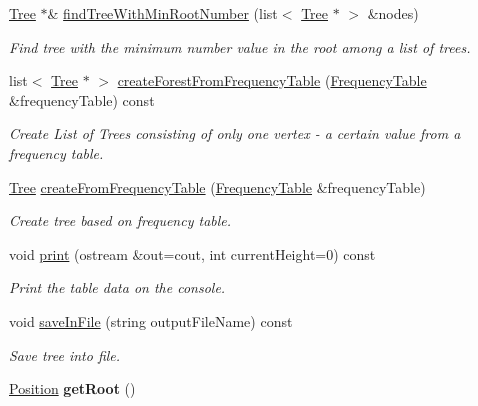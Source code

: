 \begin{DoxyCompactItemize}
\mbox{\hyperlink{class_tree}{Tree}} $\ast$\& \mbox{\hyperlink{class_tree_a7bac2fabb211e80df087763da187d3f6}{find\+Tree\+With\+Min\+Root\+Number}} (list$<$ \mbox{\hyperlink{class_tree}{Tree}} $\ast$ $>$ \&nodes)
\begin{DoxyCompactList}\small\item\em Find tree with the minimum number value in the root among a list of trees. \end{DoxyCompactList}\item 
list$<$ \mbox{\hyperlink{class_tree}{Tree}} $\ast$ $>$ \mbox{\hyperlink{class_tree_a64d7bc9c77c95100c84b708fac936820}{create\+Forest\+From\+Frequency\+Table}} (\mbox{\hyperlink{class_frequency_table}{Frequency\+Table}} \&frequency\+Table) const
\begin{DoxyCompactList}\small\item\em Create List of Trees consisting of only one vertex -\/ a certain value from a frequency table. \end{DoxyCompactList}\item 
\mbox{\hyperlink{class_tree}{Tree}} \mbox{\hyperlink{class_tree_a57608dabdd310f0c412c5d2a03faa9c0}{create\+From\+Frequency\+Table}} (\mbox{\hyperlink{class_frequency_table}{Frequency\+Table}} \&frequency\+Table)
\begin{DoxyCompactList}\small\item\em Create tree based on frequency table. \end{DoxyCompactList}\item 
\mbox{\label{class_tree_a06a149462a8abcc4e548c1f0e3561ee7}} 
void \mbox{\hyperlink{class_tree_a06a149462a8abcc4e548c1f0e3561ee7}{print}} (ostream \&out=cout, int current\+Height=0) const
\begin{DoxyCompactList}\small\item\em Print the table data on the console. \end{DoxyCompactList}\item 
void \mbox{\hyperlink{class_tree_aa62007059bd76aa204028499f4ad264c}{save\+In\+File}} (string output\+File\+Name) const
\begin{DoxyCompactList}\small\item\em Save tree into file. \end{DoxyCompactList}\item 
\mbox{\label{class_tree_a618967f14a6a47aa54c13b5a0596b8de}} 
\mbox{\hyperlink{class_tree_1_1_position}{Position}} {\bfseries get\+Root} ()
\end{DoxyCompactItemize}


